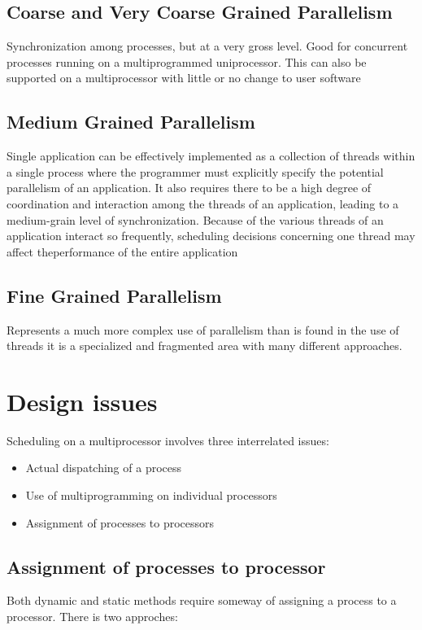 \subsection{Coarse and Very Coarse Grained Parallelism}
Synchronization among processes, but at a very gross level. Good for concurrent processes running on a multiprogrammed uniprocessor. This can also be supported on a multiprocessor with little or no change to user software
\subsection{Medium Grained Parallelism}
Single application can be effectively implemented as a collection of
threads within a single process where the programmer must explicitly specify the potential parallelism of an application. It also requires there to be a high degree of coordination and interaction among the threads of an application, leading to a medium-grain level of synchronization. Because of the various threads of an application interact so frequently, scheduling decisions concerning one thread may affect theperformance of the entire application

\subsection{Fine Grained Parallelism}
Represents a much more complex use of parallelism than is found in
the use of threads it is a specialized and fragmented area with many different approaches.


\section{Design issues}
Scheduling on a multiprocessor involves three interrelated issues:
\begin{itemize}
\item 
Actual dispatching of a process
\item 
Use of multiprogramming on individual processors
\item 
Assignment of processes to processors
\end{itemize}

\subsection{Assignment of processes to processor}
Both dynamic and static methods require someway of assigning a process to a processor.
There is two approches:

